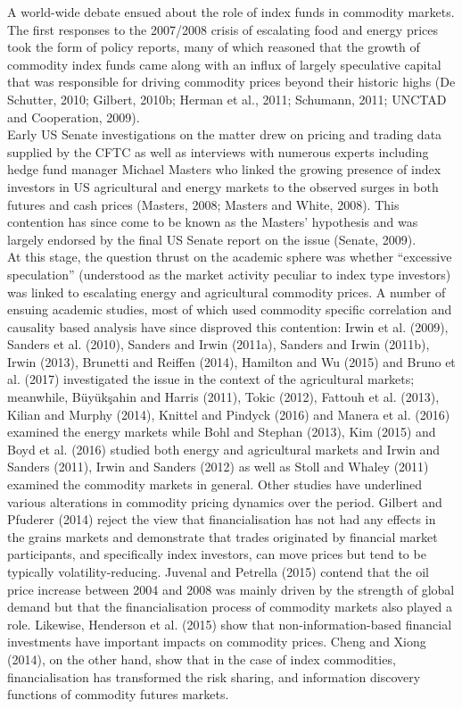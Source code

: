 \documentclass[]{elsarticle} %
\begin{document}
A world-wide debate ensued about the role of index funds in commodity markets. The first responses to the 2007/2008 crisis of escalating food and energy prices took the form of policy reports, many of which reasoned that the growth of commodity index funds came along with an influx of largely speculative capital that was responsible for driving commodity prices beyond their historic highs (De Schutter, 2010; Gilbert, 2010b; Herman et al., 2011; Schumann, 2011; UNCTAD and Cooperation, 2009).\\
Early US Senate investigations on the matter drew on pricing and trading data supplied by the CFTC as well as interviews with numerous experts including hedge fund manager Michael Masters who linked the growing presence of index investors in US agricultural and energy markets to the observed surges in both futures and cash prices (Masters, 2008; Masters and White, 2008). This contention has since come to be known as the Masters' hypothesis and was largely endorsed by the final US Senate report on the issue (Senate, 2009).\\
At this stage, the question thrust on the academic sphere was whether ``excessive speculation'' (understood as the market activity peculiar to index type investors) was linked to escalating energy and agricultural commodity prices. A number of ensuing academic studies, most of which used commodity specific correlation and causality based analysis have since disproved this contention: Irwin et al. (2009), Sanders et al. (2010), Sanders and Irwin (2011a), Sanders and Irwin (2011b), Irwin (2013), Brunetti and Reiffen (2014), Hamilton and Wu (2015) and Bruno et al. (2017) investigated the issue in the context of the agricultural markets; meanwhile, Büyükşahin and Harris (2011), Tokic (2012), Fattouh et al. (2013), Kilian and Murphy (2014), Knittel and Pindyck (2016) and Manera et al. (2016) examined the energy markets while Bohl and Stephan (2013), Kim (2015) and Boyd et al. (2016) studied both energy and agricultural markets and Irwin and Sanders (2011), Irwin and Sanders (2012) as well as Stoll and Whaley (2011) examined the commodity markets in general. Other studies have underlined various alterations in commodity pricing dynamics over the period. Gilbert and Pfuderer (2014) reject the view that financialisation has not had any effects in the grains markets and demonstrate that trades originated by financial market participants, and specifically index investors, can move prices but tend to be typically volatility-reducing. Juvenal and Petrella (2015) contend that the oil price increase between 2004 and 2008 was mainly driven by the strength of global demand but that the financialisation process of commodity markets also played a role. Likewise, Henderson et al. (2015) show that non-information-based financial investments have important impacts on commodity prices. Cheng and Xiong (2014), on the other hand, show that in the case of index commodities, financialisation has transformed the risk sharing, and information discovery functions of commodity futures markets.
\end{document}
